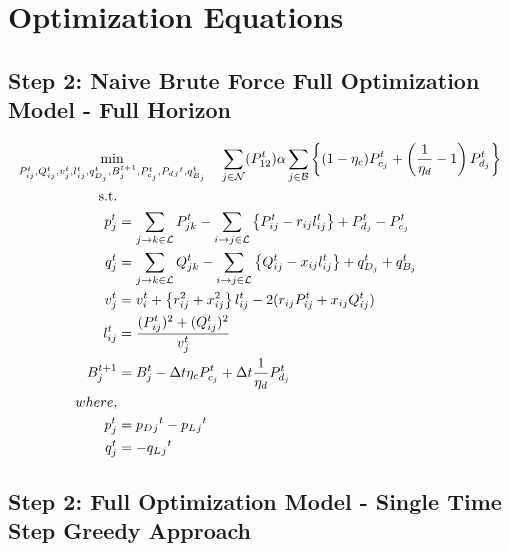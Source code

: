 \section*{Optimization Equations}

\subsection*{Step 2: Naive Brute Force Full Optimization Model - Full Horizon}

\begin{gather}
    \min_{P_{ij}^t, Q_{ij}^t, v_{j}^t, l_{ij}^t, q_{D_j}^t, B_{j}^{t+1},
	P_{c_j}^t, P_d{_j}^t, q_{B_j}^t} \quad
	\sum_{j \in \mathcal{N}} (P_{12}^t) 
	\alpha \sum_{j \in \mathcal{B}} \left\{ (1- \eta_c)P_{c_j}^t + \left(\frac{1}{\eta_d}-1\right) P_{d_j}^t \right\} \\
	\begin{align}
		\text{s.t.} & {}\nonumber \\
		{p_j^t} & = {\sum_{\fromto{j,k} \in \mathcal{L}} P_{jk}^t - \sum_{\fromto{i,j} \in \mathcal{L}}\left\{P_{ij}^t - r_{ij}l_{ij}^t\right\} + P_{d_j}^t - P_{c_j}^t} && \\
		{q_j^t} & = {\sum_{\fromto{j,k} \in \mathcal{L}} Q_{jk}^t - \sum_{\fromto{i,j} \in \mathcal{L}}\left\{Q_{ij}^t - x_{ij}l_{ij}^t\right\} + q_{D_j}^t + q_{B_j}^t} && \\
		{v_j^t} & = {v_{i}^t +  \left\{r_{ij}^2 + x_{ij}^2\right\}l_{ij}^t - 2(r_{ij}P_{ij}^t + x_{ij}Q_{ij}^t)} && \\
		{l_{ij}^t} & = {\frac{(P_{ij}^{t})^2 + (Q_{ij}^{t})^2}{v_j^t}} \\
		{B_{j}^{t+1}} &= {B_{j}^{t} - \Delta t  \eta_c P_{c_j}^t + \Delta t\frac{1}{\eta_d} P_{d_j}^t} \\
		{where,} & {} \\
		{p_j^t} &= {p_D{_j}^t - p_L{_j}^t} \\
		{q_j^t} &= {-q_L{_j}^t}
	\end{align}
\end{gather}

\subsection*{Step 2: Full Optimization Model - Single Time Step Greedy Approach}


